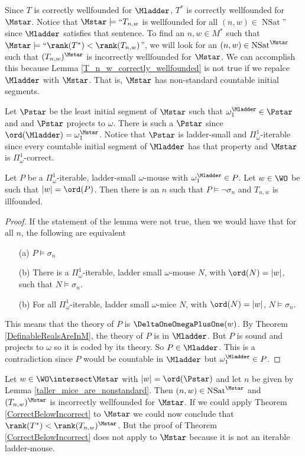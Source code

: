 \documentclass[oneside,12pt]{amsart}
\DeclareMathOperator{\NSat}{NSat}
\begin{document}
Since $T$ is correctly wellfounded for $\Mladder$, $T^*$ is correctly wellfounded for $\Mstar$.
Notice that $\Mstar\models\text{``}T_{n,w}$ is wellfounded for all $(n,w)\in \NSat$''
since $\Mladder$ satisfies that sentence. To find an $n,w\in M^*$ such that
$\Mstar\models\text{``}\rank(T^*) < \rank(T_{n,w})$'', we will look for an
$(n,w)\in \NSat^{\Mstar}$
such that $(T_{n,w})^{\Mstar}$ is incorrectly wellfounded for $\Mstar$.
We can accomplish this because Lemma \ref{T_n_w_correctly_wellfounded} is not
true if we repalce $\Mladder$ with $\Mstar$. That is, $\Mstar$ has non-standard
countable initial segments.

Let $\Pstar$ be the least initial segment of $\Mstar$ such that
$\omega_1^{\Mladder}\in\Pstar$ and
and $\Pstar$ projects to $\omega$. There is such a $\Pstar$ since
$\ord(\Mladder)=\omega_1^{\Mstar}$. Notice that $\Pstar$ is ladder-small and
$\Pi^1_{\omega}$-iterable since every countable initial segment of $\Mladder$
has that property and $\Mstar$ is $\Pi^1_{\omega}$-correct.

\begin{lemma}
\label{taller_mice_are_nonstandard}
Let $P$ be a  $\Pi^1_{\omega}$-iterable,
ladder-small $\omega$-mouse with $\omega_1^{\Mladder}\in P$.
Let $w\in\WO$ be such that $|w|=\ord(P)$.
Then there is an $n$ such that $P\models \neg\sigma_n$ and $T_{n,w}$ is illfounded.
\end{lemma}
\begin{proof}
If the statement of the lemma were not true, then we would have that for all $n$,
the following are equivalent
\begin{enumerate}
\item[(a)] $P\models\sigma_n$
\item[(b)] There is a $\Pi^1_{\omega}$-iterable, ladder small $\omega$-mouse $N$,
with $\ord(N)=|w|$, such that $N\models\sigma_n$.
\item[(b)] For all $\Pi^1_{\omega}$-iterable, ladder small $\omega$-mice $N$,
with $\ord(N)=|w|$, $N\models\sigma_n$.
\end{enumerate}
This means that the theory of $P$ is $\DeltaOneOmegaPlusOne(w)$. By Theorem
\ref{DefinableRealsAreInM}, the theory of $P$ is in $\Mladder$. But $P$ is
sound and projects to $\omega$ so it is coded by its theory. So
$P\in\Mladder$. This is a contradiction since $P$ would be countable in
$\Mladder$ but $\omega_1^{\Mladder}\in P$.
\end{proof}

Let $w\in\WO\intersect\Mstar$ with $|w|=\ord(\Pstar)$ and let
$n$ be given by Lemma \ref{taller_mice_are_nonstandard}. Then
$(n,w)\in \NSat^{\Mstar}$ and
$(T_{n,w})^{\Mstar}$ is incorrectly wellfounded for $\Mstar$. If we could apply
Theorem \ref{CorrectBelowIncorrect} to $\Mstar$ we could now conclude
that $\rank(T^*) < \rank(T_{n,w})^{\Mstar}$. But the proof of
Theorem \ref{CorrectBelowIncorrect} does not apply to $\Mstar$ because it is
not an iterable ladder-mouse.




\end{document}
